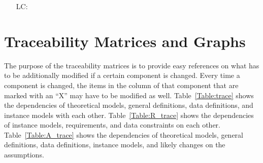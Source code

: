 \documentclass[12pt]{article}
\newcounter{lcnum} %
\begin{document}
\noindent \begin{itemize}

\item[LC\refstepcounter{lcnum}\thelcnum\label{LC_meaningfulLabel}:] 

\end{itemize}

\section{Traceability Matrices and Graphs}

The purpose of the traceability matrices is to provide easy references on what
has to be additionally modified if a certain component is changed.  Every time a
component is changed, the items in the column of that component that are marked
with an ``X'' may have to be modified as well.  Table~\ref{Table:trace} shows the
dependencies of theoretical models, general definitions, data definitions, and
instance models with each other. Table~\ref{Table:R_trace} shows the
dependencies of instance models, requirements, and data constraints on each
other. Table~\ref{Table:A_trace} shows the dependencies of theoretical models,
general definitions, data definitions, instance models, and likely changes on
the assumptions.

\end{document}
